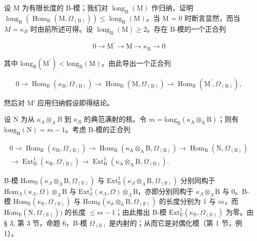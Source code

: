 设 M 为有限长度的 B-模；我们对 \(\operatorname{long}_{\mathrm{B}}(\mathrm{M})\) 作归纳，证明 \(\operatorname{long}_{\mathrm{B}}(\operatorname{Hom}_{\mathrm{B}}(\mathrm{M},\Omega_{(\mathrm{B})})) \leqslant \operatorname{long}_{\mathrm{B}}(\mathrm{M})\)。当 M = 0 时断言显然，而当 \(M = \kappa_{B}\) 时由前所述可得。设 \(\operatorname{long}_{\mathrm{B}}(\mathrm{M}) \geqslant 2\)。存在 B-模的一个正合列

\[
0 \rightarrow \mathrm{M} ^ {\prime} \rightarrow \mathrm{M} \rightarrow \kappa_ {\mathrm{B}} \rightarrow 0
\]

其中 \(\mathrm{long}_{\mathrm{B}}(\mathrm{M}^{\prime}) < \mathrm{long}_{\mathrm{B}}(\mathrm{M})\)。由此导出一个正合列

\[
0 \to \operatorname{Hom} _ {\mathrm{B}} (\kappa_ {\mathrm{B}}, \Omega_ {(\mathrm{B})}) \to \operatorname{Hom} _ {\mathrm{B}} (\mathrm{M}, \Omega_ {(\mathrm{B})}) \to \operatorname{Hom} _ {\mathrm{B}} (\mathrm{M} ^ {\prime}, \Omega_ {(\mathrm{B})}),
\]

然后对 M′ 应用归纳假设即得结论。

设 N 为从 \(\kappa_{A} \otimes_{A} B\) 到 \(\kappa_{B}\) 的典范满射的核。令 \(m = \text{long}_{\text{B}}(\kappa_{\text{A}} \otimes_{\text{A}} \text{B})\)；则有 \(\text{long}_{\text{B}}(\text{N}) = m - 1\)。考虑 B-模的正合列

\[
\begin{array}{c} 0 \to \operatorname{Hom} _ {\mathrm{B}} (\kappa_ {\mathrm{B}}, \Omega_ {(\mathrm{B})}) \longrightarrow \operatorname{Hom} _ {\mathrm{B}} (\kappa_ {\mathrm{A}} \otimes_ {\mathrm{A}} \mathrm{B}, \Omega_ {(\mathrm{B})}) \longrightarrow \operatorname{Hom} _ {\mathrm{B}} (\mathrm{N}, \Omega_ {(\mathrm{B})}) \\ \longrightarrow \operatorname{Ext} _ {\mathrm{B}} ^ {1} (\kappa_ {\mathrm{B}}, \Omega_ {(\mathrm{B})}) \longrightarrow \operatorname{Ext} _ {\mathrm{B}} ^ {1} (\kappa_ {\mathrm{A}} \otimes_ {\mathrm{A}} \mathrm{B}, \Omega_ {(\mathrm{B})}). \end{array}
\]

B-模 \(\mathrm{Hom}_{\mathbb{B}}(\kappa_{\Lambda}\otimes_{\Lambda}\mathrm{B},\Omega_{(\mathbb{B})})\) 与 \(\mathrm{Ext}_{\mathbb{B}}^{1}(\kappa_{\Lambda}\otimes_{\Lambda}\mathrm{B},\Omega_{(\mathbb{B})})\) 分别同构于 \(\mathrm{Hom}_{\Lambda}(\kappa_{\Lambda},\Omega)\otimes_{\Lambda}\mathrm{B}\) 与 \(\mathrm{Ext}_{\mathbb{A}}^{1}(\kappa_{\Lambda},\Omega)\otimes_{\Lambda}\mathrm{B}\)，亦即分别同构于 \(\kappa_{\Lambda}\otimes_{\Lambda}\mathrm{B}\) 与 0。B-模 \(\mathrm{Hom}_{\mathbb{B}}(\kappa_{\mathbb{B}},\Omega_{(\mathbb{B})})\) 与 \(\mathrm{Hom}_{\mathbb{B}}(\kappa_{\mathbb{A}}\otimes_{\mathbb{A}}\mathrm{B},\Omega_{(\mathbb{B})})\) 的长度分别为 1 与 \(m\)，而 \(\mathrm{Hom}_{\mathbb{B}}(\mathrm{N},\Omega_{(\mathbb{B})}))\) 的长度 \(\leqslant m - 1\)；由此推出 B-模 \(\mathrm{Ext}_{\mathbb{B}}^{1}(\kappa_{\mathbb{B}},\Omega_{(\mathbb{B})})\) 为零。由 § 3, 第 3 节，命题 6，B-模 \(\Omega_{(\mathbb{B})}\) 是内射的；从而它是对偶化模（第 1 节，例 1）。

